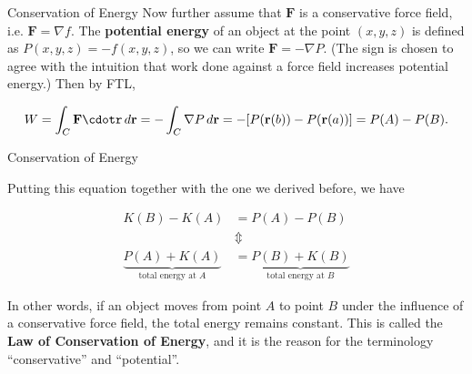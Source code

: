 \documentclass[11pt,english,
handout
]{beamer}
\begin{document}
\begin{frame}{Conservation of Energy}
\small
Now further assume that $\mathbf{F}$ is a conservative force field, i.e. $\mathbf{F}=\nabla f$. \pause The \textbf{potential energy} of an object at the point $(x,y,z)$ is defined as $P(x,y,z)=-f(x,y,z)$, so we can write $\mathbf{F}=-\nabla P$. (The sign is chosen to agree with the intuition that work done against a force field increases potential energy.) \pause Then by FTL,

\[
W=\int_C\mathbf{F}\cdotr\,d\mathbf{r}=-\int_C\nabla P\,d\mathbf{r}=-[P(\mathbf{r}(b))-P(\mathbf{r}(a))]=P(A)-P(B).
\]
\end{frame}











\begin{frame}{Conservation of Energy}
\small

Putting this equation together with the one we derived before, we have

\begin{align*}
K(B)-K(A)&=P(A)-P(B)\\[3mm]
&\Updownarrow\\[3mm]
\underbrace{P(A)+K(A)}_\text{total energy at $A$}&=\underbrace{P(B)+K(B)}_\text{total energy at $B$}
\end{align*}\pause

In other words, if an object moves from point $A$ to point $B$ under the influence of a conservative force field, the total energy remains constant. This is called the \textbf{Law of Conservation of Energy}, and it is the reason for the terminology ``conservative'' and ``potential''.
\end{frame}
\end{document}
